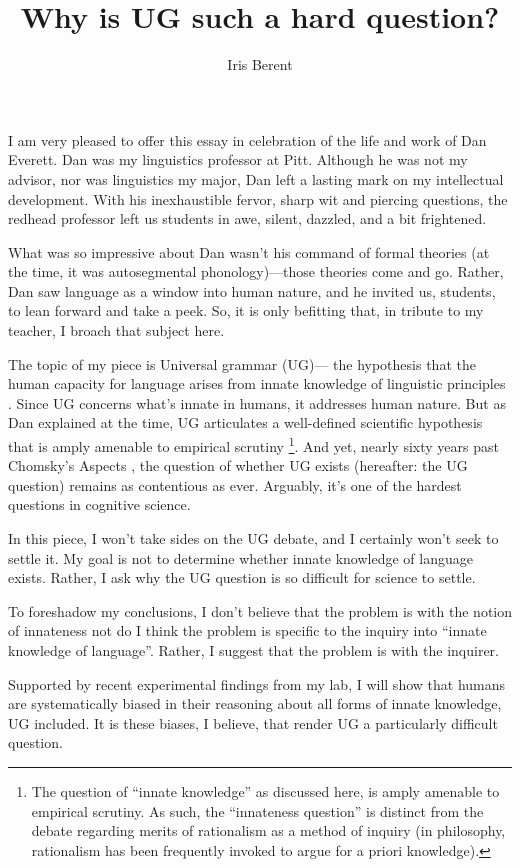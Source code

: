 \documentclass[output=paper,colorlinks,citecolor=brown
]{langscibook}
\author{Iris Berent\orcid{0000-0003-2820-9693}\affiliation{Northeastern University}}
\title{Why is UG such a hard question?}
\begin{document}
\maketitle

I am very pleased to offer this essay in celebration of the life and work of Dan Everett. Dan was my linguistics professor at Pitt. Although he was not my advisor, nor was linguistics my major, Dan left a lasting mark on my intellectual development. With his inexhaustible fervor, sharp wit and piercing questions, the redhead professor left us students in awe, silent, dazzled, and a bit frightened. 

What was so impressive about Dan wasn’t his command of formal theories (at the time, it was autosegmental phonology)—those theories come and go. Rather, Dan saw language as a window into human nature, and he invited us, students, to lean forward and take a peek. So, it is only befitting that, in tribute to my teacher, I broach that subject here.

The topic of my piece is Universal grammar (UG)— the hypothesis that the human capacity for language arises from innate knowledge of linguistic principles \citep{chomsky1965aspects}. Since UG concerns what’s innate in humans, it addresses human nature.  But as Dan explained at the time, UG articulates a well-defined scientific hypothesis that is amply amenable to empirical scrutiny \footnote{The question of “innate knowledge” as discussed here, is amply amenable to empirical scrutiny. As such, the “innateness question” is distinct from the debate regarding merits of rationalism as a method of inquiry (in philosophy, rationalism has been frequently invoked to argue for a priori knowledge).}. And yet, nearly sixty years past Chomsky’s Aspects \citep{chomsky1965aspects}, the question of whether UG exists (hereafter: the UG question) remains as contentious as ever.  Arguably, it’s one of the hardest questions in cognitive science.

In this piece, I won’t take sides on the UG debate, and I certainly won’t seek to settle it.  My goal is not to determine whether innate knowledge of language exists. Rather, I ask why the UG question is so difficult for science to settle.  

To foreshadow my conclusions, I don’t believe that the problem is with the notion of innateness not do I think the problem is specific to the inquiry into “innate knowledge of language”. Rather, I suggest that the problem is with the inquirer.  

Supported by recent experimental findings from my lab, I will show that humans are systematically biased in their reasoning about all forms of innate knowledge, UG included. It is these biases, I believe, that render UG a particularly difficult question.
\end{document}
